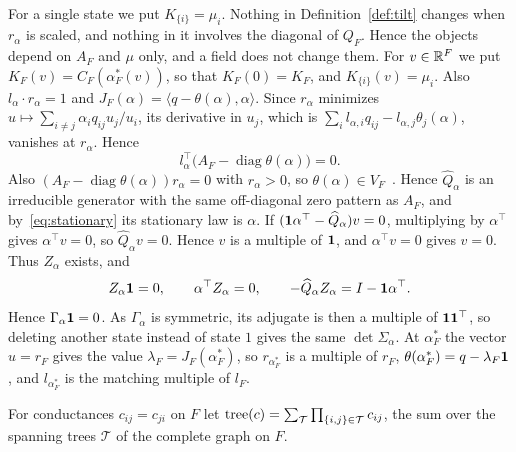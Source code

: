 For a single state we put $K_{\{i\}}=\mu_i$.
Nothing in Definition~\ref{def:tilt} changes when $r_\alpha$ is scaled, and nothing
in it involves the diagonal of $Q_F$. Hence the objects depend on $A_F$ and $\mu$ only, and a
field does not change them. For $v\in\mathbb{R}^F$ we put $K_F(v)=C_F(\alpha^*_F(v))$, so
that $K_F(0)=K_F$, and $K_{\{i\}}(v)=\mu_i$. Also
$l_\alpha\cdot r_\alpha=1$ and $J_F(\alpha)=\langle q-\theta(\alpha),\alpha\rangle$. Since
$r_\alpha$ minimizes $u\mapsto\sum_{i\ne j}\alpha_iq_{ij}u_j/u_i$, its derivative in $u_j$, which
is $\sum_il_{\alpha,i}q_{ij}-l_{\alpha,j}\theta_j(\alpha)$, vanishes at $r_\alpha$. Hence
\begin{equation}\label{eq:stationary}
l_\alpha^\top\bigl(A_F-\operatorname{diag}\theta(\alpha)\bigr)=0 .
\end{equation}
Also $(A_F-\operatorname{diag}\theta(\alpha))r_\alpha=0$ with $r_\alpha>0$, so $\theta(\alpha)\in
V_F$~\cite{bermanplemmons1994}. Hence $\widehat Q_\alpha$ is an irreducible generator with the
same off-diagonal zero pattern as $A_F$, and by~\eqref{eq:stationary} its stationary law is
$\alpha$. If $(\mathbf{1}\alpha^\top-\widehat Q_\alpha)v=0$, multiplying by $\alpha^\top$ gives
$\alpha^\top v=0$, so $\widehat Q_\alpha v=0$. Hence $v$ is a multiple of $\mathbf{1}$, and
$\alpha^\top v=0$ gives $v=0$. Thus $Z_\alpha$ exists, and
\begin{equation}\label{eq:Zprops}
Z_\alpha\mathbf{1}=0,\qquad\alpha^\top Z_\alpha=0,\qquad
-\widehat Q_\alpha Z_\alpha=I-\mathbf{1}\alpha^\top .
\end{equation}
Hence $\Gamma_\alpha\mathbf{1}=0$. As $\Gamma_\alpha$ is symmetric, its adjugate is then a multiple of
$\mathbf{1}\mathbf{1}^\top$, so deleting another state instead of state $1$ gives the same
$\det\Sigma_\alpha$. At $\alpha^*_F$ the vector $u=r_F$ gives the value $\lambda_F=J_F(\alpha^*_F)$,
so $r_{\alpha^*_F}$ is a multiple of $r_F$, $\theta(\alpha^*_F)=q-\lambda_F\mathbf{1}$, and
$l_{\alpha^*_F}$ is the matching multiple of $l_F$.

For conductances $c_{ij}=c_{ji}$ on $F$ let
$\operatorname{tree}(c)=\sum_{\mathcal T}\prod_{\{i,j\}\in\mathcal T}c_{ij}$, the sum over
the spanning trees $\mathcal T$ of the complete graph on $F$.

